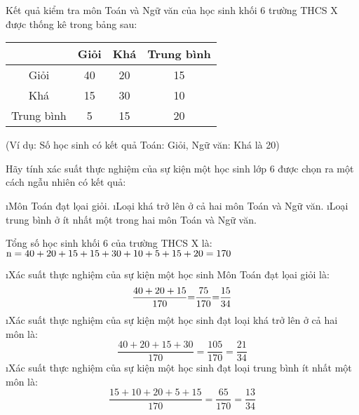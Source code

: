 \begin{bt}
	Kết quả kiểm tra môn Toán và Ngữ văn của học sinh khối 6 trường THCS X được thống kê trong bảng sau:
	\begin{center}
		\begin{tabular}{|c|c|c|c|}
			\hline
			\backslashbox{Toán}{Ngữ Văm}&	Giỏi&	Khá	&Trung bình\\
			\hline
			Giỏi & 40& 20& 15 \\
			\hline	 
			Khá	 & 15 & 30&10\\
			\hline
			Trung bình & 5& 15& 20\\
			\hline	
		\end{tabular}
	\end{center} 
	(Ví dụ: Số học sinh có kết quả Toán: Giỏi, Ngữ văn: Khá là 20)
	
	Hãy tính xác suất thực nghiệm của sự kiện một học sinh lớp 6 được chọn ra một cách ngẫu nhiên có kết quả:
	\begin{enumerate}[a),leftmargin=*]
		\i Môn Toán đạt lọai giỏi.
		\i Loại khá trở lên ở cả hai môn Toán và Ngữ văn.
		\i Loại trung bình ở ít nhất một trong hai môn Toán và Ngữ văn.
	\end{enumerate}
	\begin{loigiaichuong41}
		Tổng số học sinh khối 6 của trường THCS X là:  ${\rm{n  =  40  +  20  + 15  + 15  +  30  +  10  +  5  +  15  +  20  =  170}}$ 
		\begin{enumerate}[a),leftmargin=*]
			\i Xác suất thực nghiệm của sự kiện một học sinh Môn Toán đạt lọai giỏi là:
			\[\dfrac{{{\rm{40 + 20 + 15}}}}{{{\rm{170}}}}{\rm{ = }}\dfrac{{{\rm{75}}}}{{{\rm{170}}}}{\rm{ = }}\dfrac{{{\rm{15}}}}{{{\rm{34}}}}\]
			\i Xác suất thực nghiệm cůa sự kiện một học sinh đạt loại khá trở lên ở cả hai môn là:      
			\[\dfrac{{40 + 20 + 15 + 30}}{{170}} = \dfrac{{105}}{{170}} = \dfrac{{21}}{{34}}\]                       
			\i Xác suất thực nghiệm cůa sự kiện một học sinh đạt loại trung bình ít nhất một môn là: 
			\[\dfrac{{15 + 10 + 20 + 5 + 15}}{{170}} = \dfrac{{65}}{{170}} = \dfrac{{13}}{{34}}\] 
		\end{enumerate}
	\end{loigiaichuong41}
\end{bt}
